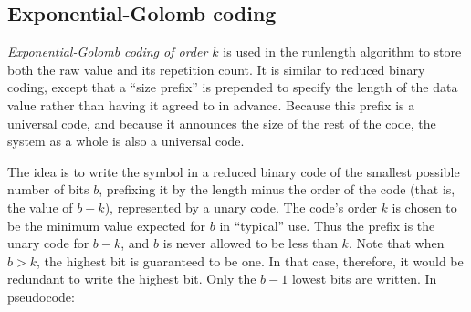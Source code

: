 \documentclass[11pt]{article}
\begin{document}



\subsection{Exponential-Golomb coding   \label{sec:mexp-golomb}}

\emph{Exponential-Golomb coding of order $k$} is used in the runlength
algorithm to store both the raw value and its repetition count.  It is
similar to reduced binary coding, except that a ``size prefix'' is
prepended to specify the length of the data value rather than having
it agreed to in advance.  Because this prefix is a universal code, and
because it announces the size of the rest of the code, the system as a
whole is also a universal code.

The idea is to write the symbol in a reduced binary code of the
smallest possible number of bits $b$, prefixing it by the length minus
the order of the code (that is, the value of $b-k$), represented by a
unary code.  The code's order $k$ is chosen to be the minimum value
expected for $b$ in ``typical'' use.  Thus the prefix is the unary
code for $b-k$, and $b$ is never allowed to be less than $k$.  Note
that when $b>k$, the highest bit is guaranteed to be one.  In that
case, therefore, it would be redundant to write the highest bit.  Only
the $b-1$ lowest bits are written.  In pseudocode:
\end{document}
